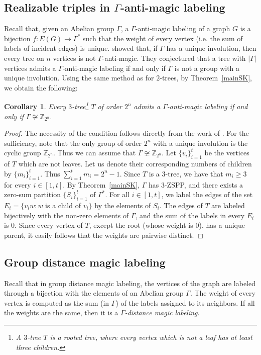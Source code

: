 \documentclass[final]{dmtcs-episciences}
\newtheorem{cor}[thm]{Corollary}
\newcommand{\zet}{\mathbb{Z}}
\begin{document}
\subsection{\texorpdfstring{Realizable triples in $\Gamma$-anti-magic labeling}{Realizable triples in Gamma-anti-magic labeling}}\label{subsec:gaml}
Recall that, given an Abelian group $\Gamma$, a $\Gamma$-anti-magic labeling of a graph $G$ is a bijection $f\colon E(G)\to \Gamma^*$ such that the weight of every vertex (i.e. the sum of labels of incident edges) is unique. \citet{KLR} showed that, if $\Gamma$ has a unique involution, then every tree on $n$ vertices is not $\Gamma$-anti-magic. They conjectured that a tree with $|\Gamma|$ vertices admits a $\Gamma$-anti-magic labeling if and only if $\Gamma$ is not a group with a unique involution. Using the same method as \citet{KLR} for $2$-trees, by Theorem~\ref{mainSK}, we obtain the following:
\begin{cor}Every $3$-tree\footnote{A $3$-tree $T$ is a rooted tree, where every vertex which is not a leaf has at least three children.} $T$ of order $2^n$ admits a $\Gamma$-anti-magic labeling if and only if $\Gamma \not \cong \zet_{2^n}$.\end{cor}
\begin{proof} 
The necessity of the condition follows directly from the work of \citet{KLR}.
For the sufficiency, note that the only group  of order $2^n$ with a unique involution is the cyclic group $\zet_{2^n}$. Thus we can assume that $\Gamma \not \cong \zet_{2^n}$. Let $\{v_i\}_{i=1}^{t}$ be the vertices of $T$ which are not leaves. Let us denote their corresponding numbers of children by $\{m_i\}_{i=1}^{t}$. Thus $\sum_{i=1}^{t}m_i=2^n-1$. Since $T$ is a
$3$-tree, we have that $m_i \geq 3$ for every $i\in[1,t]$. By Theorem~\ref{mainSK}, $\Gamma$ has $3$-ZSPP, and there exists a zero-sum partition $\{S_i\}_{i=1}^{t}$ of $\Gamma^*$.
For all $i\in[1,t]$, we label the edges of the set $E_i=\{v_iw\colon w$ is a child of $v_i\}$ by the elements of $S_i$. The edges of $T$ are labeled bijectively with the non-zero elements of $\Gamma$, and the sum of
the labels in every $E_i$ is $0$. Since every vertex of $T$, except the root (whose weight is $0$), has a unique parent, it easily follows that the weights are pairwise distinct.
\end{proof}

\subsection{Group distance magic labeling}\label{subsec:gdml}
Recall that in group distance magic labeling, the vertices of the graph are labeled through a bijection with the elements of an Abelian group $\Gamma$. The weight of every vertex is computed as the sum (in $\Gamma$) of the labels assigned to its neighbors. If all the weights are the same, then it is a \textit{$\Gamma$-distance magic labeling}. 
\end{document}
